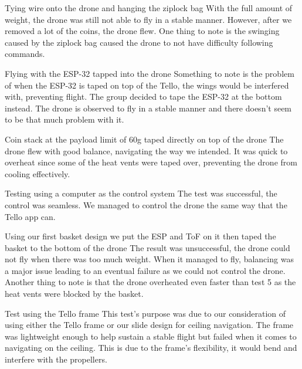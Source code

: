\documentclass[12pt]{article}
\begin{document}
                 {Tying wire onto the drone and hanging the ziplock bag} {
                    With the full amount of weight, the drone was still not able to fly in a stable manner.
                    However, after we removed a lot of the coins, the drone flew.
                    One thing to note is the swinging caused by the ziplock bag caused the drone to not have difficulty following commands.
                }

                 {Flying with the ESP-32 tapped into the drone} {
                    Something to note is the problem of when the ESP-32 is taped on top of the Tello, the wings would be interfered with, preventing flight.
                    The group decided to tape the ESP-32 at the bottom instead.
                    The drone is observed to fly in a stable manner and there doesn't seem to be that much problem with it.
                }

                 {Coin stack at the payload limit of 60g taped directly on top of the drone} {
                    The drone flew with good balance, navigating the way we intended.
                    It was quick to overheat since some of the heat vents were taped over, preventing the drone from cooling effectively.
                }

                 {Testing using a computer as the control system} {
                    The test was successful, the control was seamless.
                    We managed to control the drone the same way that the Tello app can.
                }

                 {Using our first basket design we put the ESP and ToF on it then taped the basket to the bottom of the drone} {
                    The result was unsuccessful, the drone could not fly when there was too much weight.
                    When it managed to fly, balancing was a major issue leading to an eventual failure as we could not control the drone.
                    Another thing to note is that the drone overheated even faster than test 5 as the heat vents were blocked by the basket.
                }

                 {Test using the Tello frame} {
                    This test's purpose was due to our consideration of using either the Tello frame or our slide design for ceiling navigation.
                    The frame was lightweight enough to help sustain a stable flight but failed when it comes to navigating on the ceiling.
                    This is due to the frame's flexibility, it would bend and interfere with the propellers.
                }
\end{document}
